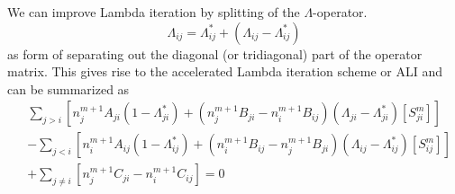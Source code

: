 \documentclass{article}
\begin{document}
We can improve Lambda iteration by splitting of the \(\Lambda\)-operator.
\begin{equation}
    \Lambda_{ij} = \Lambda^{\ast}_{ij} + (\Lambda_{ij} - \Lambda^{\ast}_{ij})
\end{equation}
as form of separating out the diagonal (or tridiagonal) part of the operator
matrix. This gives rise to the accelerated Lambda iteration scheme or ALI and
can be summarized as
\begin{equation}\label{eq:6}
    \begin{split}
        &\sum_{j > i} [n_j^{m+1} A_{ji}(1-\Lambda^{\ast}_{ji})
        + (n_j^{m+1} B_{ji} - n_i^{m+1} B_{ij})
        (\Lambda_{ji} - \Lambda^{\ast}_{ji})
        [S_{ji}^m]] \\
        & - \sum_{j < i} [n_i^{m+1} A_{ij}(1-\Lambda^{\ast}_{ij})
        + (n_i^{m+1} B_{ij} - n_j^{m+1} B_{ji})
        (\Lambda_{ij} - \Lambda^{\ast}_{ij})
        [S_{ij}^m]] \\
        & + \sum_{j \neq i} [n_j^{m+1} C_{ji} - n_i^{m+1} C_{ij}] = 0
    \end{split}
\end{equation}
\end{document}
